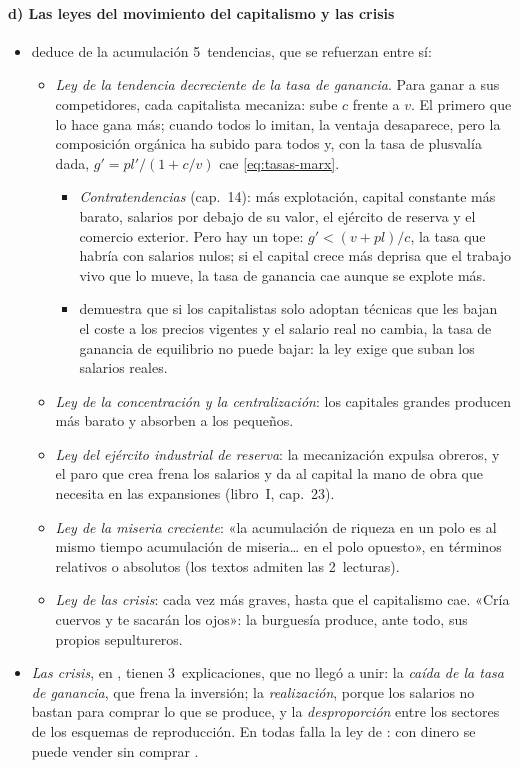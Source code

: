 \documentclass[11pt]{article}
\begin{document}
\paragraph{d) Las leyes del movimiento del capitalismo y las crisis}
\begin{itemize}
\item {} deduce de la acumulación 5~tendencias, que se refuerzan entre sí:
  \begin{itemize}
  \item \emph{Ley de la tendencia decreciente de la tasa de ganancia}\nocite{Marx1894Kapital}. Para ganar a sus competidores, cada capitalista mecaniza: sube $c$ frente a $v$. El primero que lo hace gana más; cuando todos lo imitan, la ventaja desaparece, pero la composición orgánica ha subido para todos y, con la tasa de plusvalía dada, $g'=\mathit{pl}'/(1+c/v)$ cae \eqref{eq:tasas-marx}.
    \begin{itemize}
    \item \emph{Contratendencias} (cap.~14): más explotación, capital constante más barato, salarios por debajo de su valor, el ejército de reserva y el comercio exterior. Pero hay un tope: $g'<(v+\mathit{pl})/c$, la tasa que habría con salarios nulos; si el capital crece más deprisa que el trabajo vivo que lo mueve, la tasa de ganancia cae aunque se explote más.
    \item \textcite{Okishio1961Technical} demuestra que si los capitalistas solo adoptan técnicas que les bajan el coste a los precios vigentes y el salario real no cambia, la tasa de ganancia de equilibrio no puede bajar: la ley exige que suban los salarios reales.
    \end{itemize}
  \item \emph{Ley de la concentración y la centralización}: los capitales grandes producen más barato y absorben a los pequeños.
  \item \emph{Ley del ejército industrial de reserva}: la mecanización expulsa obreros, y el paro que crea frena los salarios y da al capital la mano de obra que necesita en las expansiones (libro~I, cap.~23).
  \item \emph{Ley de la miseria creciente}: «la acumulación de riqueza en un polo es al mismo tiempo acumulación de miseria… en el polo opuesto»\nocite{Marx1867Kapital}, en términos relativos o absolutos (los textos admiten las 2~lecturas).
  \item \emph{Ley de las crisis}: cada vez más graves, hasta que el capitalismo cae. «Cría cuervos y te sacarán los ojos»: la burguesía produce, ante todo, sus propios sepultureros\nocite{MarxEngels1848Manifest}.
  \end{itemize}
\item \emph{Las crisis}, en , tienen 3~explicaciones, que no llegó a unir: la \emph{caída de la tasa de ganancia}, que frena la inversión; la \emph{realización}, porque los salarios no bastan para comprar lo que se produce, y la \emph{desproporción} entre los sectores de los esquemas de reproducción. En todas falla la ley de : con dinero se puede vender sin comprar .
\end{itemize}
\end{document}
